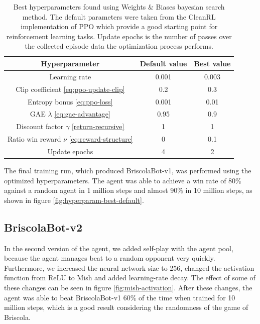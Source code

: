 \begin{table}[H]
    \centering
    \begin{tabular}{ccc}
        \hline
        Hyperparameter                                     & Default value & Best value \\
        \hline
        Learning rate                                      & 0.001         & 0.003      \\
        Clip coefficient \eqref{eq:ppo-update-clip}        & 0.2           & 0.3        \\
        Entropy bonus \eqref{eq:ppo-loss}                  & 0.001         & 0.01       \\
        GAE $\lambda$ \eqref{eq:gae-advantage}             & 0.95          & 0.9        \\
        Discount factor $\gamma$ \eqref{return-recursive}  & 1             & 1          \\
        Ratio win reward $\nu$ \eqref{eq:reward-structure} & 0             & 0.1        \\
        Update epochs                                      & 4             & 2          \\
    \end{tabular}
    \caption{Best hyperparameters found using Weights \& Biases bayesian search method. The default parameters were taken from the CleanRL implementation of PPO \cite{huang2022cleanrl} which provide a good starting point for reinforcement learning tasks. Update epochs is the number of passes over the collected episode data the optimization process performs.}
    \label{tab:hyperparam-best}
\end{table}

The final training run, which produced BriscolaBot-v1, was performed using the optimized hyperparameters. The agent was able to achieve a win rate of 80\% against a random agent in 1 million steps and almost 90\% in 10 million steps, as shown in figure \ref{fig:hyperparam-best-default}.

\subsection{BriscolaBot-v2}
In the second version of the agent, we added self-play with the agent pool, because the agent manages beat to a random opponent very quickly. Furthermore, we increased the neural network size to 256, changed the activation function from ReLU to Mish \cite{misra2019mish} and added learning-rate decay. The effect of some of these changes can be seen in figure \ref{fig:mish-activation}. After these changes, the agent was able to beat BriscolaBot-v1 60\% of the time when trained for 10 million steps, which is a good result considering the randomness of the game of Briscola.

